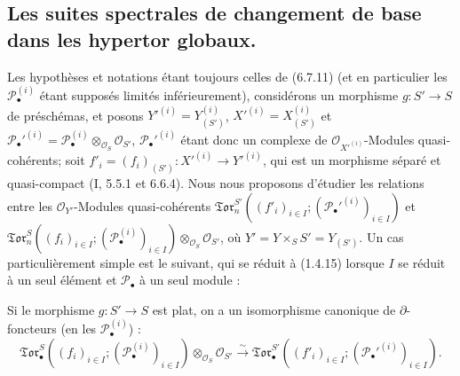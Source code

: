 \subsection{Les suites spectrales de changement de base dans les hypertor
globaux.}

\begin{env}[6.9.1]
Les hypothèses et notations étant toujours celles de (6.7.11) (et en
particulier les $\mathscr P_\bullet^{(i)}$ étant supposés limités
inférieurement), considérons un morphisme $g:S'\to S$ de préschémas, et
posons
$Y'^{(i)}=Y_{(S')}^{(i)}$, $X'^{(i)}=X_{(S')}^{(i)}$ et
$\mathscr P_\bullet'^{(i)}=
\mathscr P_\bullet^{(i)}\otimes_{\mathscr O_S}\mathscr O_{S'}$,
$\mathscr P_\bullet'^{(i)}$ étant donc un complexe de
$\mathscr O_{X'^{(i)}}$-Modules quasi-cohérents; soit
$f'_i=(f_i)_{(S')}:X'^{(i)}\to Y'^{(i)}$, qui est un morphisme séparé et
quasi-compact (I, 5.5.1 et 6.6.4). Nous nous proposons d'étudier les relations
entre les $\mathscr O_{Y'}$-Modules quasi-cohérents
$\mathfrak{Tor}_n^{S'}((f'_i)_{i\in I};
(\mathscr P_\bullet'^{(i)})_{i\in I})$ et
$\mathfrak{Tor}_n^S((f_i)_{i\in I};
(\mathscr P_\bullet^{(i)})_{i\in I})
\otimes_{\mathscr O_S}\mathscr O_{S'}$, où
$Y'=Y\times_S S'=Y_{(S')}$. Un cas particulièrement simple est le suivant,
qui se réduit à (1.4.15) lorsque $I$ se réduit à un seul élément et
$\mathscr P_\bullet$ à un seul module :
\end{env}

\begin{proposition}[6.9.2]
Si le morphisme $g:S'\to S$ est plat, on a un isomorphisme canonique de
$\partial$-foncteurs (en les $\mathscr P_\bullet^{(i)}$) :
\[
  \mathfrak{Tor}_\bullet^S
  ((f_i)_{i\in I};(\mathscr P_\bullet^{(i)})_{i\in I})
  \otimes_{\mathscr O_S}\mathscr O_{S'}
  \xrightarrow{\sim}
  \mathfrak{Tor}_\bullet^{S'}
  ((f'_i)_{i\in I};(\mathscr P_\bullet'^{(i)})_{i\in I}).
  \tag{6.9.2.1}\label{III.6.9.2.1.fr}
\]
\end{proposition}

